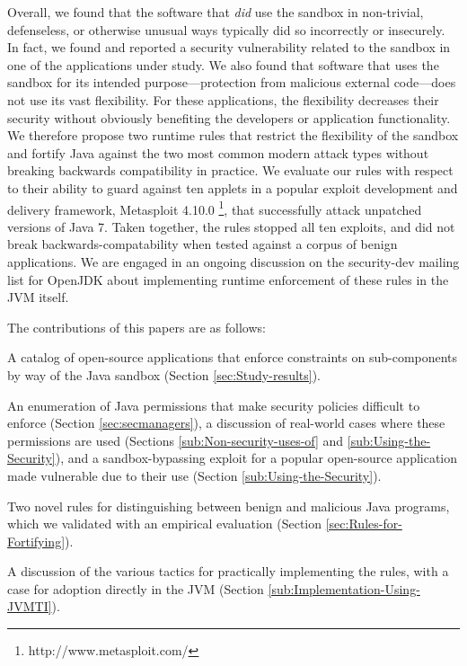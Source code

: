 \documentclass{sig-alternate}
\begin{document}
Overall, we found that the software that \emph{did} use the sandbox in
non-trivial, defenseless, or otherwise
unusual ways typically did so incorrectly or insecurely. In fact, we found and reported a
security vulnerability related to the sandbox in one of the applications under study. We also found that
software that uses the sandbox for its intended
purpose---protection from malicious external code---does not use its
vast flexibility.  For these applications, the flexibility decreases their security without
obviously benefiting the developers or application functionality.  We therefore propose 
two runtime rules that restrict the flexibility of the sandbox and fortify Java
against the two most common modern attack types without breaking backwards
compatibility in practice. We evaluate our rules
with respect to their ability to guard against ten applets in a popular exploit development 
and delivery framework, Metasploit
4.10.0%
\footnote{http://www.metasploit.com/}, that successfully attack unpatched
versions of Java 7. 
Taken together, the rules stopped all ten exploits, and did not break
backwards-compatability 
when tested against a corpus of benign applications.
We are engaged in an
ongoing discussion on the security-dev mailing list for OpenJDK about
implementing runtime enforcement of these rules in the JVM itself.

The contributions of this papers are as follows:
\begin{flushitem}	\setlength{\parskip}{0pt}
  \setlength{\parsep}{0pt}
  \setlength{\itemsep}{0pt}
\item A catalog of open-source applications that enforce constraints on
  sub-components by way of the Java sandbox (Section \ref{sec:Study-results}).
\item {}
\item An enumeration of Java permissions that make security policies difficult
  to enforce (Section \ref{sec:secmanagers}), a discussion of real-world cases
  where these permissions are used (Sections \ref{sub:Non-security-uses-of} and
  \ref{sub:Using-the-Security}), and a sandbox-bypassing exploit for a popular
  open-source application made vulnerable due to their use (Section
  \ref{sub:Using-the-Security}).
\item Two novel rules for distinguishing between benign and malicious Java
  programs, which we validated with an empirical evaluation (Section
  \ref{sec:Rules-for-Fortifying}).
\item A discussion of the various tactics for practically implementing the
  rules, with a case for adoption directly in the JVM (Section
  \ref{sub:Implementation-Using-JVMTI}).
\end{flushitem}
\end{document}
